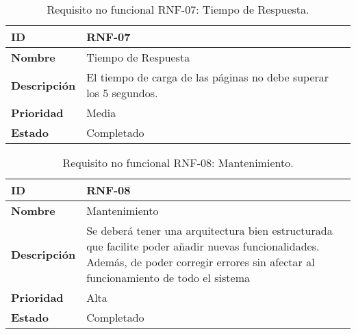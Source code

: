 \begin{table}[H]
    \centering
    \begin{tabular}{|l|p{9.5cm}|}
        \hline
        \textbf{ID} & RNF-07 \\
        \hline
        \textbf{Nombre} & Tiempo de Respuesta \\
        \hline
        \textbf{Descripción} & El tiempo de carga de las páginas no debe superar los 5 segundos. \\
        \hline
        \textbf{Prioridad} & Media \\
        \hline
        \textbf{Estado} & Completado \\
        \hline
    \end{tabular}
    \caption{Requisito no funcional RNF-07: Tiempo de Respuesta.}
    \label{table:req-RNF38}
\end{table}


\begin{table}[H]
    \centering
    \begin{tabular}{|l|p{9.5cm}|}
        \hline
        \textbf{ID} & RNF-08 \\
        \hline
        \textbf{Nombre} & Mantenimiento \\
        \hline
        \textbf{Descripción} & Se deberá tener una arquitectura bien estructurada que facilite poder añadir nuevas funcionalidades. Además, de poder corregir errores sin afectar al funcionamiento de todo el sistema  \\
        \hline
        \textbf{Prioridad} & Alta \\
        \hline
        \textbf{Estado} & Completado \\
        \hline
    \end{tabular}
    \caption{Requisito no funcional RNF-08: Mantenimiento.}
    \label{table:req-RNF39}
\end{table}
